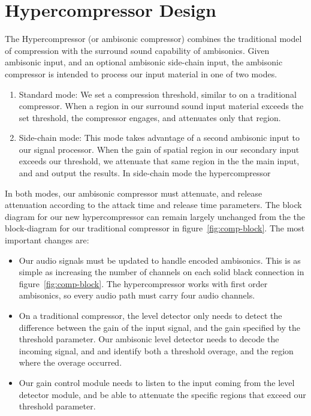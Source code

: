 \section{Hypercompressor Design}
\label{sec:hypercomp-design}
The Hypercompressor (or ambisonic compressor) combines the traditional
model of compression with the surround sound capability of
ambisonics. Given ambisonic input, and an optional ambisonic
side-chain input, the ambisonic compressor is intended to process our
input material in one of two modes.
\begin{enumerate}
\item Standard mode: We set a compression threshold, similar to on a
  traditional compressor. When a region in our surround sound input
  material exceeds the set threshold, the compressor engages, and
  attenuates only that region.
\item Side-chain mode: This mode takes advantage of a second ambisonic
  input to our signal processor. When the gain of spatial region in
  our secondary input exceeds our threshold, we attenuate that same
  region in the the main input, and and output the results. In
  side-chain mode the hypercompressor 
\end{enumerate}
In both modes, our ambisonic compressor must attenuate, and release
attenuation according to the attack time and release time
parameters. The block diagram for our new hypercompressor can remain
largely unchanged from the the block-diagram for our traditional
compressor in figure~\ref{fig:comp-block}. The most important changes
are:
\begin{itemize}
\item Our audio signals must be updated to handle encoded
  ambisonics. This is as simple as increasing the number of channels
  on each solid black connection in figure~\ref{fig:comp-block}. The
  hypercompressor works with first order ambisonics, so every audio
  path must carry four audio channels.
\item On a traditional compressor, the level detector only needs to
  detect the difference between the gain of the input signal, and the
  gain specified by the threshold parameter. Our ambisonic level detector
  needs to decode the incoming signal, and and identify both a threshold
  overage, and the region where the overage occurred.
\item Our gain control module needs to listen to the input coming from
  the level detector module, and be able to attenuate the specific
  regions that exceed our threshold parameter.
\end{itemize}


